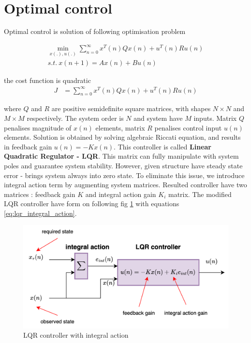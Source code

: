 \documentclass[12pt,twoside,onecolumn,openany,extrafontsizes,dvipsnames]{memoir}
\begin{document}
    \newpage
    \section{Optimal control}
       
        Optimal control is solution of following optimisation problem

        \begin{align}
            \min_{x(.), u(.)} \sum_{n=0}^\infty x^T(n)Qx(n) + u^T(n)Ru(n) \\
            s.t.\ x(n+1) = Ax(n) + Bu(n) \nonumber
        \end{align}

        the cost function is quadratic
        \begin{align}
            J &= \sum_{n=0}^\infty x^T(n)Qx(n) + u^T(n)Ru(n)
        \end{align}

        where $Q$ and $R$ are positive semidefinite square matrices, with shapes $N \times N$ and $M \times M$ respectively.
        The system order is $N$ and system have $M$ inputs.
        Matrix $Q$ penalises magnitude of $x(n)$ elements, matrix $R$ penalises control input $u(n)$ elements.
        Solution is obtained by solving algebraic Riccati equation, and results in feedback gain $u(n) = -Kx(n)$.
        This controller is called \textbf{Linear Quadratic Regulator - LQR}.
        This matrix can fully manipulate with system poles and guarantee system stability.
        However, given structure have steady state error - brings system always into zero state.
        To eliminate this issue, we introduce integral action term by augmenting system matrices. 
        Resulted controller have two matrices : feedback gain $K$ and integral action gain $K_i$ matrix.
        The modified LQR controller have form on following fig \ref{fig:control_lqr_generic} 
        with equations \ref{eq:lqr_integral_action}.

        \begin{figure}[!htb]
            \centering
            \includegraphics[scale=0.8]{../diagrams/control_generic/control_generic-lqr_discrete.png}
            \caption{LQR controller with integral action}
            \label{fig:control_lqr_generic}
        \end{figure}
\end{document}
